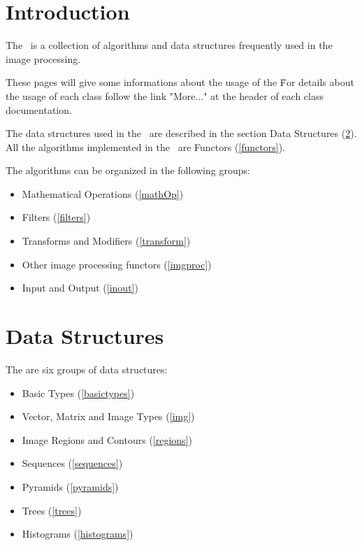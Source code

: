 \section{Introduction}\label{intro}

The \ltilib\ is a collection of algorithms and data structures frequently used
in the image processing.

These pages will give some informations about the usage of the \ltilib\.  For
details about the usage of each class follow the link "More..." at the header
of each class documentation.

The data structures used in the \ltilib\ are described in the section
Data Structures (\ref{dataStruct}).  All the algorithms implemented in
the \ltilib\ are Functors (\ref{functors}).

The algorithms can be organized in the following groups:
\begin{itemize}
\item
Mathematical Operations (\ref{mathOp})\par
\item
Filters (\ref{filters})\par
\item
Transforms and Modifiers (\ref{transform})\par
\item
Other image processing functors (\ref{imgproc})\par
\item
Input and Output (\ref{inout})\par
\end{itemize}

\section{Data Structures}\label{dataStruct}


The are six groups of data structures:\begin{itemize}
\item
Basic Types (\ref{basictypes})\par
\item
Vector, Matrix and Image Types (\ref{img})\par
\item
Image Regions and Contours (\ref{regions})\par
\item
Sequences (\ref{sequences})\par
\item
Pyramids (\ref{pyramids})\par
\item
Trees (\ref{trees})\par
\item
Histograms (\ref{histograms})\par
\end{itemize}
